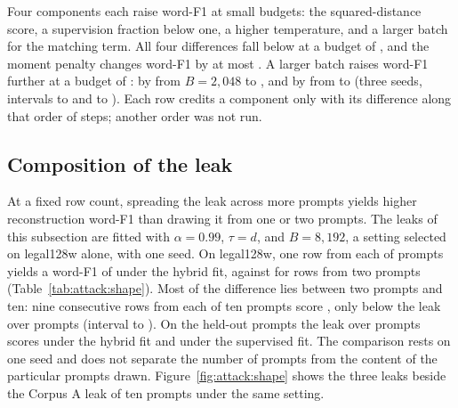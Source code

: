 Four components each raise word-F1 at small budgets: the squared-distance score, a supervision fraction below one, a higher temperature, and a larger batch for the matching term.
All four differences fall below  at a budget of , and the moment penalty changes word-F1 by at most . %
A larger batch raises word-F1 further at a budget of : by  from $B = 2{,}048$ to , and by  from  to  (three seeds, intervals  to  and  to ). %
Each row credits a component only with its difference along that order of steps; another order was not run.

\subsection{Composition of the leak}\label{sec:attack:leak}

At a fixed row count, spreading the leak across more prompts yields higher reconstruction word-F1 than drawing it from one or two prompts.
The leaks of this subsection are fitted with $\alpha = 0.99$, $\tau = d$, and $B = 8{,}192$, a setting selected on legal128w alone, with one seed. %
On legal128w, one row from each of  prompts yields a word-F1 of  under the hybrid fit, against  for  rows from two prompts (Table~\ref{tab:attack:shape}). %
Most of the difference lies between two prompts and ten: nine consecutive rows from each of ten prompts score , only  below the leak over  prompts (interval  to ). %
On the  held-out prompts the leak over  prompts scores  under the hybrid fit and  under the supervised fit. %
The comparison rests on one seed and does not separate the number of prompts from the content of the particular prompts drawn.
Figure~\ref{fig:attack:shape} shows the three leaks beside the Corpus A leak of ten prompts under the same setting.

